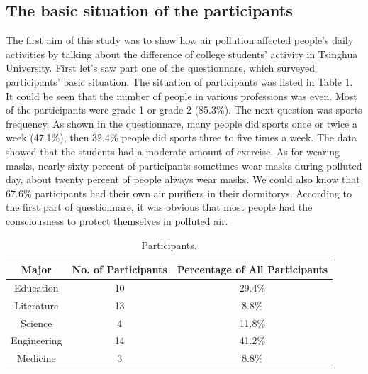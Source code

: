 \subsection{The basic situation of the participants}

The first aim of this study was to show how air pollution affected people’s daily activities by talking about the difference of college students’ activity in Tsinghua University. First let's saw part one of the questionnare, which surveyed participants’ basic situation. The situation of participants was listed in Table 1. It could be seen that the number of people in various professions was even. Most of the participants were grade 1 or grade 2 (85.3\%). The next question was sports frequency. As shown in the questionnare, many people did sports once or twice a week (47.1\%), then 32.4\% people did sports three to five times a week. The data showed that the students had a moderate amount of exercise. As for wearing masks, nearly sixty percent of participants sometimes wear masks during polluted day, about twenty percent of people always wear masks. We could also know that 67.6\% participants had their own air purifiers in their dormitorys. According to the first part of questionnare, it was obvious that most people had the consciousness to protect themselves in polluted air.

\begin{table}
\centering
\caption{Participants.}
\begin{tabular}{c|c|c}
Major & No. of Participants & Percentage of All Participants\\\hline
Education & 10 & 29.4\% \\
Literature & 13 & 8.8\% \\
Science & 4 & 11.8\% \\
Engineering & 14 & 41.2\% \\
Medicine & 3 & 8.8\%

\end{tabular}
\end{table}

